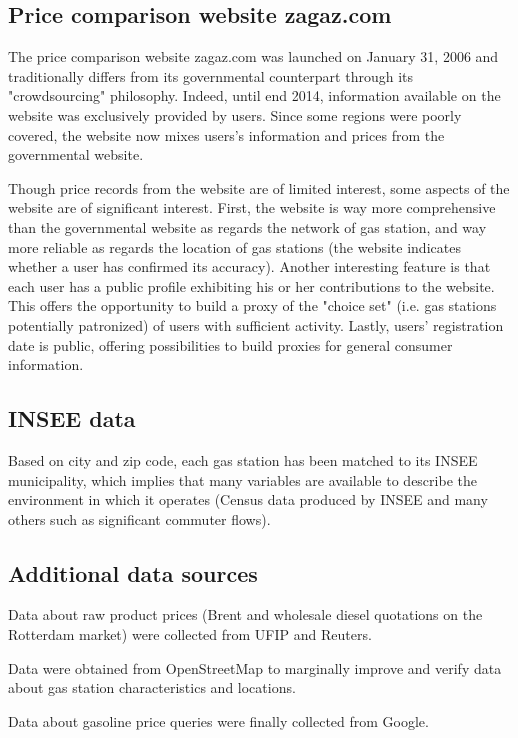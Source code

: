 \documentclass[11pt]{article}
\begin{document}
\subsection{Price comparison website zagaz.com}

The price comparison website zagaz.com was launched on January 31, 2006 and traditionally differs from its governmental counterpart through its "crowdsourcing" philosophy. Indeed, until end 2014, information available on the website was exclusively provided by users. Since some regions were poorly covered, the website now mixes users's information and prices from the governmental website.

Though price records from the website are of limited interest, some aspects of the website are of significant interest. First, the website is way more comprehensive than the governmental website as regards the network of gas station, and way more reliable as regards the location of gas stations (the website indicates whether a user has confirmed its accuracy). Another interesting feature is that each user has a public profile exhibiting his or her contributions to the website. This offers the opportunity to build a proxy of the "choice set" (i.e. gas stations potentially patronized) of users with sufficient activity. Lastly, users' registration date is public, offering possibilities to build proxies for general consumer information.

\subsection{INSEE data}

Based on city and zip code, each gas station has been matched to its INSEE municipality, which implies that many variables are available to describe the environment in which it operates (Census data produced by INSEE and many others such as significant commuter flows).

\subsection{Additional data sources}

Data about raw product prices (Brent and wholesale diesel quotations on the Rotterdam market) were collected from UFIP and Reuters.

Data were obtained from OpenStreetMap to marginally improve and verify data about gas station characteristics and locations.

Data about gasoline price queries were finally collected from Google.
\end{document}
